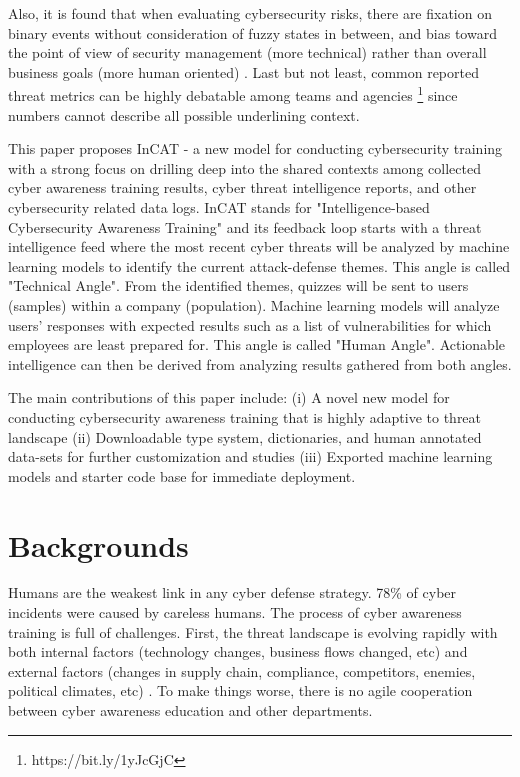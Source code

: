 \documentclass{article} %
\begin{document}
Also, it is found that when evaluating cybersecurity risks, there are fixation on binary events without consideration of fuzzy states in between, and bias toward the point of view of security management (more technical) rather than overall business goals (more human oriented) \cite{Dhillon2011Developer-drivenTrenches} \cite{Bayuk2013SecurityConstruct}. Last but not least, common reported threat metrics can be highly debatable among teams and agencies \footnote{https://bit.ly/1yJcGjC} since numbers cannot describe all possible underlining context. 

This paper proposes InCAT - a new model for conducting cybersecurity training with a strong focus on drilling deep into the shared contexts among collected cyber awareness training results, cyber threat intelligence reports, and other cybersecurity related data logs. InCAT stands for "Intelligence-based Cybersecurity Awareness Training" and its feedback loop starts with a threat intelligence feed where the most recent cyber threats will be analyzed by machine learning models to identify the current attack-defense themes. This angle is called "Technical Angle". From the identified themes, quizzes will be sent to users (samples) within a company (population). Machine learning models will analyze users' responses with expected results such as a list of vulnerabilities for which employees are least prepared for. This angle is called "Human Angle". Actionable intelligence can then be derived from analyzing results gathered from both angles.

The main contributions of this paper include: (i) A novel new model for conducting cybersecurity awareness training that is highly adaptive to threat landscape (ii) Downloadable type system, dictionaries, and human annotated data-sets for further customization and studies (iii) Exported machine learning models and starter code base for immediate deployment.

\section{Backgrounds}
Humans are the weakest link in any cyber defense strategy. 78\% of cyber incidents were caused by careless humans\cite{PonemonInstitute20172017Overview}. The process of cyber awareness training is full of challenges. First, the threat landscape is evolving rapidly with both internal factors (technology changes, business flows changed, etc) and external factors (changes in supply chain, compliance, competitors, enemies, political climates, etc) \cite{Ingalsbe2008ThreatEnd, Manadhata2011AnMetric}. To make things worse, there is no agile cooperation between cyber awareness education and other departments. 
\end{document}
